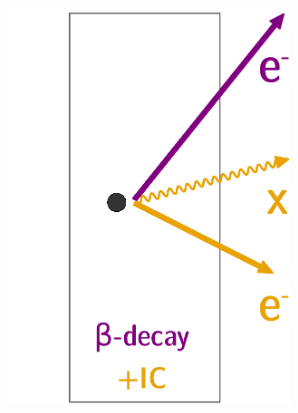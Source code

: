 \begin{figure}[!h]
\centering
\begin{subfigure}[t]{0.32\textwidth}
  \centering
  \includegraphics[width=0.82\textwidth]{SNdemonstrator/fig_SNdemonstrator/internal_contamination_IC.pdf}
  \captionsetup{justification=justified}
  \caption{
    \label{subfig:cont_Pint_eff}}
\end{subfigure}
\hfill
\begin{subfigure}[t]{0.32\textwidth}
  \centering

\end{subfigure}
\end{figure}
